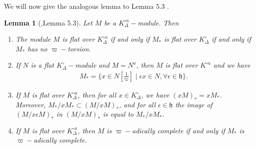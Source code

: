 \documentclass[12pts,a4paper]{amsart}
\newtheorem{lemma}[proposition]{Lemma}
\begin{document}
We will now give the analogous lemma to Lemma 5.3 \cite{Sch}.

\begin{lemma}[\cite{Sch},Lemma 5.3]\label{lemma5.1}
	Let $M$ be a $K^{\circ a}_\Delta-$module. Then
	\begin{enumerate}
		\item[(i).] The module $M$ is flat over $K^{\circ a}_\Delta$ if and only if $M_*$ is flat over $K^\circ_\Delta$ if and only if $M_*$ has no $\varpi-$torsion.
		\item[(ii).] If $N$ is a flat $K^\circ_\Delta-$module and $M=N^a$, then $M$ is flat over $K^{\circ a}$ and we have
		\begin{align*}
			M_*=\Big\{x\in N\left[\frac{1}{\varpi}\right] \mid \epsilon x\in N, \forall \epsilon\in\mathfrak{h}\Big\} .
		\end{align*}
		\item[(iii).] If $M$ is flat over $K^{\circ a}_\Delta$, then for all $x\in K^\circ_\Delta$, we have $(xM)_*=xM_*$. Moreover, $M_*/xM_*\subset (M/xM)_*$, and for all $\epsilon\in\mathfrak{h}$ the image of $(M/x\epsilon M)_*$ in $(M/xM)_*$ is equal to $M_*/xM_*$.
		\item[(iv).] If $M$ is flat over $K^{\circ a}_\Delta$, then $M$ is $\varpi-$adically complete if and only if $M_*$ is $\varpi-$adically complete.
	\end{enumerate}
\end{lemma}
\end{document}
